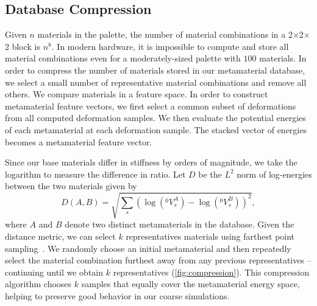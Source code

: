 \subsection{Database Compression}
\label{sec:compression}
Given $n$ materials in the palette, the number of material combinations in a 2$\times$2$\times$2 block is $n^8$. In modern hardware, it is impossible to compute and store all material combinations even for a moderately-sized palette with $100$ materials.
In order to compress the number of materials stored in our metamaterial database, we select a small number of representative material combinations and remove all others. We compare materials in a feature space. In order to construct metamaterial feature vectors, we first select a common subset of deformations from all computed deformation samples. We then evaluate the potential energies of each metamaterial at each deformation sample. The stacked vector of energies becomes a metamaterial feature vector. 

Since our base materials differ in stiffness by orders of magnitude, we take the logarithm to measure the difference in ratio.
Let $D$ be the $L^2$ norm of log-energies between the two materials given by
\begin{equation}
D(A,B)=\sqrt{\sum_s (\log(^0V^{A}_{s})-\log(^0V^{B}_{s}))^2},
\end{equation} where $A$ and $B$ denote two distinct metamaterials in the database. 
Given the distance metric, we can select $k$ representatives materials using farthest point sampling~\cite{eldar1997farthest}. We randomly choose an initial metamaterial and then repeatedly select the material combination furthest away from any previous representatives -- continuing until we obtain $k$ representatives (\autoref{fig:compression}). This compression algorithm chooses $k$ samples that equally cover the metamaterial energy space, helping to preserve good behavior in our coarse simulations. 
